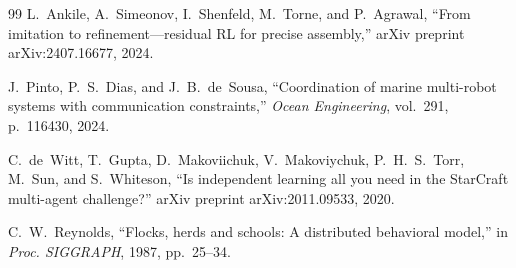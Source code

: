 \documentclass[journal]{IEEEtran}
\begin{document}
\begin{thebibliography}{99}
L.~Ankile, A.~Simeonov, I.~Shenfeld, M.~Torne, and P.~Agrawal,
``From imitation to refinement---residual RL for precise assembly,''
arXiv preprint arXiv:2407.16677, 2024.

J.~Pinto, P.~S.~Dias, and J.~B.~de~Sousa,
``Coordination of marine multi-robot systems with communication constraints,''
\emph{Ocean Engineering}, vol.~291, p.~116430, 2024.

C.~de~Witt, T.~Gupta, D.~Makoviichuk, V.~Makoviychuk, P.~H.~S.~Torr, M.~Sun, and S.~Whiteson,
``Is independent learning all you need in the StarCraft multi-agent challenge?''
arXiv preprint arXiv:2011.09533, 2020.

C.~W.~Reynolds,
``Flocks, herds and schools: A distributed behavioral model,''
in \emph{Proc. SIGGRAPH}, 1987, pp.~25--34.

\end{thebibliography}
\end{document}
